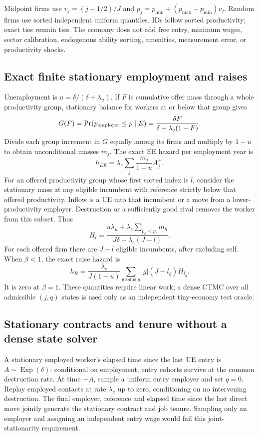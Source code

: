 \documentclass[11pt,letterpaper]{article}
\begin{document}
Midpoint firms use $v_j=(j-1/2)/J$ and
$p_j=p_{\min}+(p_{\max}-p_{\min})v_j$. Random firms use sorted
independent uniform quantiles. IDs follow sorted productivity; exact
ties remain ties. The economy does not add free entry, minimum wages,
sector calibration, endogenous ability sorting, amenities, measurement
error, or productivity shocks.

\subsection{Exact finite stationary employment and raises}
Unemployment is $u=\delta/(\delta+\lambda_u)$. If $F$ is cumulative
offer mass through a whole productivity group, stationary balance for
workers at or below that group gives
\begin{equation}
 G(F)=\Pr(p_{\rm employer}\le p\mid E)
 =\frac{\delta F}{\delta+\lambda_e(1-F)}.
\end{equation}
Divide each group increment in $G$ equally among its firms and multiply
by $1-u$ to obtain unconditional masses $m_j$. The exact EE hazard per
employment year is
\begin{equation}
 h_{EE}=\lambda_e\sum_j\frac{m_j}{1-u}A_j^+.
\end{equation}
For an offered productivity group whose first sorted index is $l$,
consider the stationary mass at any eligible incumbent with reference
strictly below that offered productivity. Inflow is a UE into that
incumbent or a move from a lower-productivity employer. Destruction or
a sufficiently good rival removes the worker from this subset. Thus
\begin{equation}
 H_l=\frac{u\lambda_u+\lambda_e\sum_{p_h<p_l}m_h}
 {J\delta+\lambda_e(J-l)}.
\end{equation}
For each offered firm there are $J-l$ eligible incumbents, after
excluding self. When $\beta<1$, the exact raise hazard is
\begin{equation}
 h_R=\frac{\lambda_e}{J(1-u)}
 \sum_{\text{groups }g} |g|(J-l_g)H_{l_g}.
\end{equation}
It is zero at $\beta=1$. These quantities require linear work; a dense
CTMC over all admissible $(j,q)$ states is used only as an independent
tiny-economy test oracle.

\subsection{Stationary contracts and tenure without a dense state solver}
A stationary employed worker's elapsed time since the last UE entry is
$A\sim\operatorname{Exp}(\delta)$: conditional on employment, entry
cohorts survive at the common destruction rate. At time $-A$, sample a
uniform entry employer and set $q=0$. Replay employed contacts at rate
$\lambda_e$ up to zero, conditioning on no intervening destruction.
The final employer, reference and elapsed time since the last direct
move jointly generate the stationary contract and job tenure. Sampling
only an employer and assigning an independent entry wage would fail
this joint-stationarity requirement.
\end{document}
